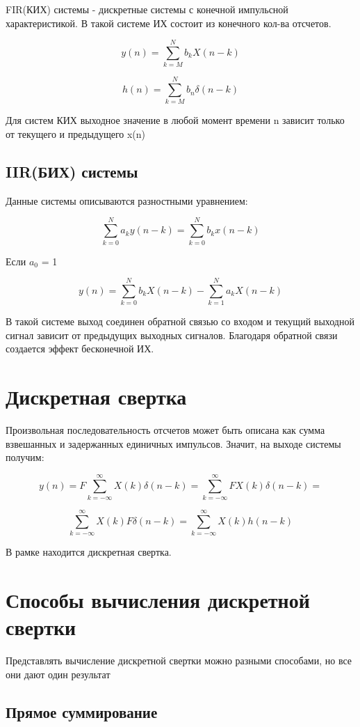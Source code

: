 FIR(КИХ) системы - дискретные системы с конечной импульсной характеристикой. В такой системе ИХ состоит из конечного кол-ва отсчетов.

$$y(n) = \sum_{k=M}^{N}b_kX(n-k)$$

$$h(n) = \sum_{k=M}^{N}b_n\delta(n-k)$$

Для систем КИХ выходное значение в любой момент времени n зависит только от текущего и предыдущего x(n)

\subsection{IIR(БИХ) системы}

Данные системы описываются разностными уравнением:

$$\sum_{k=0}^{N}a_ky(n-k) = \sum_{k=0}^{N}b_kx(n-k)$$

Если $a_0$ = 1

$$y(n) = \sum_{k=0}^{N}b_kX(n-k) - \sum_{k=1}^{N}a_kX(n-k)$$

В такой системе выход соединен обратной связью со входом и текущий выходной сигнал зависит от предыдущих выходных сигналов. Благодаря
обратной связи создается эффект бесконечной ИХ.

\section{Дискретная свертка}

Произвольная последовательность отсчетов может быть описана как сумма взвешанных и задержанных единичных импульсов. Значит, на выходе
системы получим:

$$y(n) = F{\sum_{k=-\infty}^{\infty}X(k)\delta(n-k)} = \sum_{k=-\infty}^{\infty}F{X(k)\delta(n-k)} = $$

$$\sum_{k=-\infty}^{\infty}X(k)F{\delta(n-k)} = \boxed{\sum_{k=-\infty}^{\infty}X(k)h(n-k)}$$

В рамке находится дискретная свертка.


\section{Способы вычисления дискретной свертки}

Представлять вычисление дискретной свертки можно разными способами, но все они дают один результат

\subsection{Прямое суммирование}


